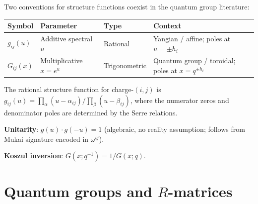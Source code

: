 Two conventions for structure functions coexist in the
quantum group literature:

\begin{center}
\begin{tabular}{@{}llll@{}}
\toprule
\textbf{Symbol} & \textbf{Parameter} & \textbf{Type}
 & \textbf{Context} \\
\midrule
$g_{ij}(u)$ & Additive spectral $u$ & Rational &
 Yangian / affine; poles at $u = \pm h_i$ \\
$G_{ij}(x)$ & Multiplicative $x = e^u$ & Trigonometric &
 Quantum group / toroidal; poles at $x = q^{\pm h_i}$ \\
\bottomrule
\end{tabular}
\end{center}

\noindent
The rational structure function for charge-$(i,j)$ is
$g_{ij}(u) = \prod_\alpha (u - \alpha_{ij}) / \prod_\beta (u - \beta_{ij})$,
where the numerator zeros and denominator poles are determined by
the Serre relations.

\medskip\noindent
\textbf{Unitarity}: $g(u) \cdot g(-u) = 1$ (algebraic, no reality
assumption; follows from Mukai signature encoded in $\omega^{ij}$).

\medskip\noindent
\textbf{Koszul inversion}: $G(x; q^{-1}) = 1/G(x; q)$.

\section{Quantum groups and \texorpdfstring{$R$}{R}-matrices}
\label{sec:nc-qg}

